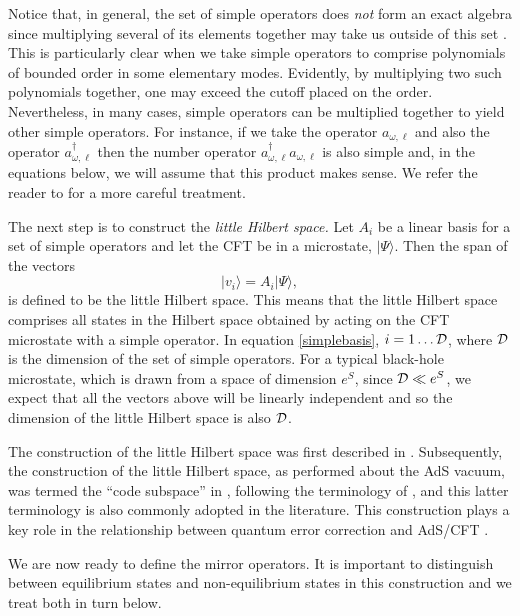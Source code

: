 \documentclass[12pt]{article}
\newcommand{\cop}[1]{#1}
\newcommand{\al}{\cop{A}} %
\newcommand{\be}{\begin{equation}}
\newcommand{\ee}{\end{equation}}
\begin{document}
Notice that, in general, the set of simple operators does {\em not} form an exact algebra since multiplying several of its elements together may take us outside of this set \cite{Ghosh:2017gtw}. This is particularly clear when we take simple operators to comprise polynomials of bounded order in some elementary modes. Evidently, by multiplying two such polynomials together, one may exceed the cutoff placed on the order. Nevertheless, in many cases, simple operators can be multiplied together to yield other simple operators. For instance, if we take the operator $a_{\omega, \ell}$ and also the operator $a_{\omega, \ell}^{\dagger}$ then the number operator $a_{\omega, \ell}^{\dagger} a_{\omega, \ell}$ is also simple and, in the equations below, we will assume that this product makes sense. We refer the reader to \cite{Papadodimas:2013jku,Papadodimas:2013wnh} for a more careful treatment.


The next step is to construct the {\em little Hilbert space.}  Let $\al_i$  be a linear basis for  a set of simple operators and let the CFT be in a microstate, $|\Psi \rangle$. Then the span of the  vectors
\be
\label{simplebasis}
|v_i \rangle = \al_i |\Psi \rangle,
\ee
is defined to be the little Hilbert space. This means that the little Hilbert space comprises all states in the Hilbert space obtained by acting on the CFT microstate with a simple operator.  In equation \eqref{simplebasis}, $i = 1 \ldots {\cal D}$, where ${\cal D}$ is the dimension of the set of simple operators. For a typical black-hole microstate, which is drawn from a space of dimension $e^{S}$, since ${\cal D} \ll e^{S}$, we expect that all the vectors above will be linearly independent and so the dimension of the little Hilbert space is also ${\cal D}$. 

The construction of the little Hilbert space was first described in \cite{Papadodimas:2013jku}. Subsequently, the construction of the little Hilbert space, as performed about the AdS vacuum,  was termed the ``code subspace'' in \cite{Almheiri:2014lwa}, following the terminology of \cite{Verlinde:2012cy}, and this latter terminology is also commonly adopted in the literature. This construction plays a key role in the relationship between quantum error correction and AdS/CFT \cite{Pastawski:2015qua}. 

We are now ready to define the mirror operators. It is important to distinguish between  equilibrium states and non-equilibrium states in this construction and we treat both in turn below.
\end{document}
